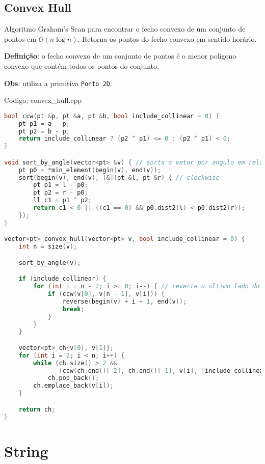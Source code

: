\documentclass[10pt, a4paper, oneside]{book}
\begin{document}
\section{Convex Hull}


Algoritmo Graham's Scan para encontrar o fecho convexo de um conjunto de pontos em $\mathcal{O}(n \log n)$. Retorna os pontos do fecho convexo em sentido horário.



\textbf{Definição}: o fecho convexo de um conjunto de pontos é o menor polígono convexo que contém todos os pontos do conjunto.



\textbf{Obs}: utiliza a primitiva \texttt{Ponto 2D}. 

\hfill

Codigo: convex\_hull.cpp

\begin{lstlisting}[language=C++]
bool ccw(pt &p, pt &a, pt &b, bool include_collinear = 0) {
    pt p1 = a - p;
    pt p2 = b - p;
    return include_collinear ? (p2 ^ p1) <= 0 : (p2 ^ p1) < 0;
}

void sort_by_angle(vector<pt> &v) { // sorta o vetor por angulo em relacao ao pivo
    pt p0 = *min_element(begin(v), end(v));
    sort(begin(v), end(v), [&](pt &l, pt &r) { // clockwise
        pt p1 = l - p0;
        pt p2 = r - p0;
        ll c1 = p1 ^ p2;
        return c1 < 0 || ((c1 == 0) && p0.dist2(l) < p0.dist2(r));
    });
}

vector<pt> convex_hull(vector<pt> v, bool include_collinear = 0) {
    int n = size(v);

    sort_by_angle(v);

    if (include_collinear) {
        for (int i = n - 2; i >= 0; i--) { // reverte o ultimo lado do poligono
            if (ccw(v[0], v[n - 1], v[i])) {
                reverse(begin(v) + i + 1, end(v));
                break;
            }
        }
    }

    vector<pt> ch{v[0], v[1]};
    for (int i = 2; i < n; i++) {
        while (ch.size() > 2 &&
               (ccw(ch.end()[-2], ch.end()[-1], v[i], !include_collinear)))
            ch.pop_back();
        ch.emplace_back(v[i]);
    }

    return ch;
}
\end{lstlisting}
\hfill

\newpage

%
%
%
%

\chapter{String}
\end{document}
